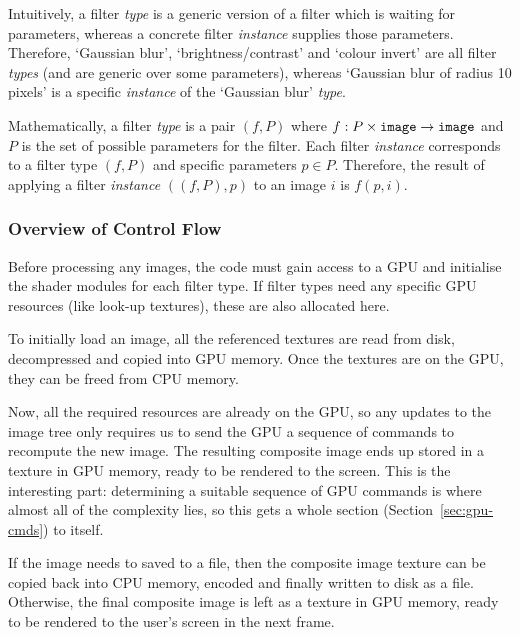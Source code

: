 \documentclass[12pt]{article}
\begin{document}
Intuitively, a filter \emph{type} is a generic version of a filter which is waiting for parameters,
whereas a concrete filter \emph{instance} supplies those parameters.  Therefore, `Gaussian blur',
`brightness/contrast' and `colour invert' are all filter \emph{types} (and are generic over some
parameters), whereas `Gaussian blur of radius 10 pixels' is a specific \emph{instance} of the
`Gaussian blur' \emph{type}.

Mathematically, a filter \emph{type} is a pair $(f, P)$ where $f: P \times \verb|image| \rightarrow
\verb|image|$ and $P$ is the set of possible parameters for the filter.  Each filter \emph{instance}
corresponds to a filter type $(f, P)$ and specific parameters $p \in P$.  Therefore, the result of
applying a filter \emph{instance} $((f, P), p)$ to an image $i$ is $f(p, i)$.

\subsubsection{Overview of Control Flow}


Before processing any images, the code must gain access to a GPU and initialise the shader modules
for each filter type.  If filter types need any specific GPU resources (like look-up textures),
these are also allocated here.

To initially load an image, all the referenced textures are read from disk, decompressed and copied
into GPU memory.  Once the textures are on the GPU, they can be freed from CPU memory.

Now, all the required resources are already on the GPU, so any updates to the image tree only
requires us to send the GPU a sequence of commands to recompute the new image.  The resulting
composite image ends up stored in a texture in GPU memory, ready to be rendered to the screen.
This is the interesting part: determining a suitable sequence of GPU commands is where almost all
of the complexity lies, so this gets a whole section (Section~\ref{sec:gpu-cmds}) to itself.

If the image needs to saved to a file, then the composite image texture can be copied back into CPU
memory, encoded and finally written to disk as a file.  Otherwise, the final composite image is left
as a texture in GPU memory, ready to be rendered to the user's screen in the next frame.
\end{document}
